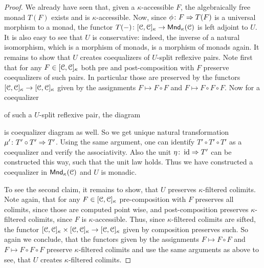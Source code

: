 \documentclass[a4paper,11pt,oneside,openany]{scrbook}
\begin{document}
\begin{proof}
	We already have seen that, given a $\kappa$-accessible $F$, the algebraically free monad $T(F)$ exists and is $\kappa$-accessible. Now, since
	$\phi \colon F \Rightarrow T(F)$ is a universal morphism to a monad, the functor $T(-) \colon [\operatorname{\mathcal{C}},\operatorname{\mathcal{C}}]_{\kappa} \to \operatorname{\mathsf{Mnd}}_{\kappa}(\operatorname{\mathcal{C}})$ is left adjoint to $U$.
	It is also easy to see that $U$ is conservative: indeed, the inverse of a natural isomorphism, which is a morphism of monads, is a morphism of monads again.
	It remains to show that $U$ creates coequalizers of $U$-split reflexive pairs. Note first that for any $F \in [\operatorname{\mathcal{C}},\operatorname{\mathcal{C}}]_{\kappa}$ both pre and post-composition
	with $F$ preserve coequalizers of such pairs. In particular those are preserved by the functors $[\operatorname{\mathcal{C}},\operatorname{\mathcal{C}}]_{\kappa} \to [\operatorname{\mathcal{C}},\operatorname{\mathcal{C}}]_{\kappa}$ given by the assignments
	$F \mapsto F \circ F$ and $F \mapsto F \circ F \circ F$. Now for a coequalizer
	\begin{center}
	\end{center}
	of such a $U$-split reflexive pair, the diagram
	\begin{center}
	\end{center}
	is coequalizer diagram as well. So we get unique natural transformation $\mu' \colon T' \circ T' \Rightarrow T'$.  Using the same argument, one can identify
	$T' \circ T' \circ T'$ as a coequalizer and verify the associativity. Also the unit $\eta \colon \operatorname{id} \Rightarrow T'$ can be constructed this way, such that the unit law
	holds. Thus we have constructed a coequalizer in $\operatorname{\mathsf{Mnd}}_{\kappa}(\operatorname{\mathcal{C}})$ and $U$ is monadic.

	To see the second claim, it remains to show, that $U$ preserves
	$\kappa$-filtered colimits. Note again, that for any $F \in [\operatorname{\mathcal{C}},\operatorname{\mathcal{C}}]_{\kappa}$ pre-composition with $F$ preserves all colimits, since those are computed point wise,
	and post-composition preserves $\kappa$-filtered colimits, since $F$ is $\kappa$-accessible.  Thus, since $\kappa$-filtered colimits are sifted, the functor
	$[\operatorname{\mathcal{C}},\operatorname{\mathcal{C}}]_{\kappa} \times [\operatorname{\mathcal{C}},\operatorname{\mathcal{C}}]_{\kappa} \to [\operatorname{\mathcal{C}},\operatorname{\mathcal{C}}]_{\kappa}$ given by composition preserves such. So again we conclude, that the functors given by the
	assignments $F \mapsto F \circ F$ and $F \mapsto F \circ F \circ F$ preserve $\kappa$-filtered colimits and use the same arguments as above to see, that
	$U$ creates $\kappa$-filtered colimits.
\end{proof}
\end{document}
